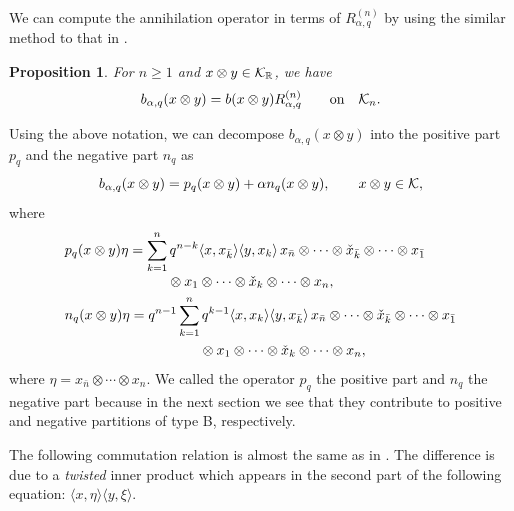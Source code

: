 \documentclass[pdftex]{sigma}
\numberwithin{equation}{section}
\newtheorem{Proposition}[Theorem]{Proposition}
 { \theoremstyle{definition}
\newtheorem{Definition}[Theorem]{Definition}
\newtheorem{Note}[Theorem]{Note}
\newtheorem{Example}[Theorem]{Example}
\newtheorem{Remark}[Theorem]{Remark} }
\def\R{{\mathbb R}}
\def\B{b_{\s,\q}}
\def\r{b}
\def\ell {n}
\def\H{{\bf \mathcal K}_{ n}}
\def\HH{{\bf \mathcal K}}
\newcommand{\q}{q}
\newcommand{\s}{\alpha}%
\begin{document}
We can compute the annihilation operator in terms of $R_{\s,\q}^{(n)}$ by using the similar
method to that in \cite[Proposition~2.4]{BozejkoEjsmontHasebe2015}.

\begin{Proposition}%
For $n \geq1$ and $x\otimes y\in \HH_\R$, we have\vspace{-1mm}
\begin{equation*}
\B(x\otimes y)=\r(x\otimes y) R^{(n)}_{\s,\q}\qquad \text{on}\quad \H.
\end{equation*}
\end{Proposition}

\begin{Remark}\label{thm1}
	Using the above notation, we can decompose $\B(x\otimes y)$ into the positive part $p_\q$ and the negative part $\ell_{\q}$ as\vspace{-1mm}
\[
	\B(x\otimes y)= p_\q(x\otimes y)+ \s \ell_{\q}(x\otimes y), \qquad x\otimes y \in \HH,
\]
where\vspace{-2mm}
\begin{align}\label{rq}
&p_\q(x\otimes y)\eta = \sum_{k=1}^n \q^{n-k}\langle x, x_{\bar{k}}\rangle \langle y, x_k \rangle\, x_{\bar n }\otimes \cdots \otimes \check{x}_{\bar k} \otimes \cdots \otimes x_{\bar 1} \nonumber
\\[-1mm]
&\hphantom{p_\q(x\otimes y)\eta = \sum_{k=1}^n}
{}\otimes x_1\otimes \cdots \otimes \check{x}_k \otimes \cdots \otimes x_n,
\\
&\ell_{\q}(x\otimes y)\eta =\q^{n-1}\sum_{k=1}^n \q^{k-1}\langle x, x_{{k}}\rangle \langle y, x_{\bar{k}}\rangle\, x_{\bar n }\otimes \cdots \otimes \check{x}_{\bar k} \otimes \cdots \otimes x_{\bar 1} \nonumber
\\
&\hphantom{\ell_{\q}(x\otimes y)\eta =\q^{n-1}\sum_{k=1}^n}
\otimes x_1\otimes \cdots \otimes \check{x}_k \otimes \cdots \otimes x_n,\label{lq}
	\end{align}
	where $\eta=x_{\bar n }\otimes \cdots \otimes x_n$.
	We called the operator $p_\q$ the positive part and $\ell_{\q}$ the negative part because in the next section we see that they contribute to positive and negative partitions of type B, respectively.
\end{Remark}

The following commutation relation is almost the same as in \cite[Proposition 2.6]{BozejkoEjsmontHasebe2015}.
The difference is due to a \emph{twisted} inner product which appears in the second part of the following equation: $\langle x,\eta \rangle\langle y,\xi\rangle$.
\end{document}
